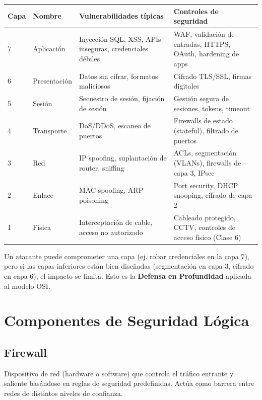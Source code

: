 \documentclass[11pt,a4paper]{article}
\begin{document}
\begin{center}
\renewcommand{\arraystretch}{1.4}
\begin{tabularx}{\textwidth}{@{} p{1.5cm} p{2.5cm} X X @{} }
\toprule
\textbf{Capa} & \textbf{Nombre} & \textbf{Vulnerabilidades típicas} & \textbf{Controles de seguridad} \\
\midrule
7 & Aplicación & Inyección SQL, XSS, APIs inseguras, credenciales débiles & WAF, validación de entradas, HTTPS, OAuth, hardening de apps \\
\midrule
6 & Presentación & Datos sin cifrar, formatos maliciosos & Cifrado TLS/SSL, firmas digitales \\
\midrule
5 & Sesión & Secuestro de sesión, fijación de sesión & Gestión segura de sesiones, tokens, timeout \\
\midrule
4 & Transporte & DoS/DDoS, escaneo de puertos & Firewalls de estado (stateful), filtrado de puertos \\
\midrule
3 & Red & IP spoofing, suplantación de router, sniffing & ACLs, segmentación (VLANs), firewalls de capa 3, IPsec \\
\midrule
2 & Enlace & MAC spoofing, ARP poisoning & Port security, DHCP snooping, cifrado de capa 2 \\
\midrule
1 & Física & Interceptación de cable, acceso no autorizado & Cableado protegido, CCTV, controles de acceso físico (Clase 6) \\
\bottomrule
\end{tabularx}
\end{center}

\begin{reflexion}
Un atacante puede comprometer una capa (ej. robar credenciales en la capa 7), pero si las capas inferiores están bien diseñadas (segmentación en capa 3, cifrado en capa 6), el impacto se limita. Esto es la \textbf{Defensa en Profundidad} aplicada al modelo OSI.
\end{reflexion}

\section{Componentes de Seguridad Lógica}

\subsection{Firewall}
\begin{definicion}[Firewall]
Dispositivo de red (hardware o software) que controla el tráfico entrante y saliente basándose en reglas de seguridad predefinidas. Actúa como barrera entre redes de distintos niveles de confianza.
\end{definicion}
\end{document}
